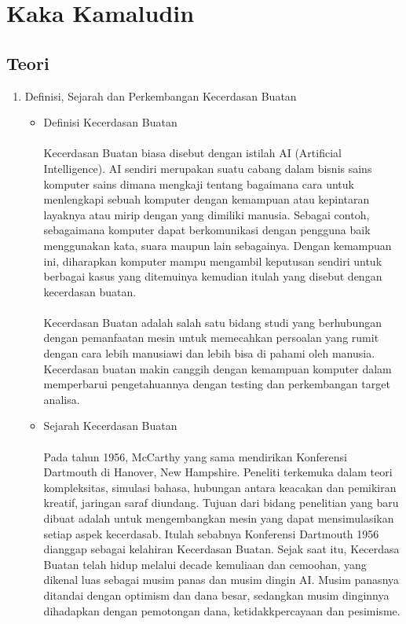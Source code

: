 \section{Kaka Kamaludin}
\subsection{Teori}

\begin{enumerate}
	\item Definisi, Sejarah dan Perkembangan Kecerdasan Buatan

		\begin{itemize}
			\item Definisi Kecerdasan Buatan
				\paragraph{}
				Kecerdasan Buatan biasa disebut dengan istilah AI (Artificial Intelligence). AI sendiri merupakan suatu cabang dalam bisnis sains komputer sains dimana mengkaji tentang bagaimana cara untuk menlengkapi sebuah komputer dengan kemampuan atau kepintaran layaknya atau mirip dengan yang dimiliki manusia. Sebagai contoh, sebagaimana komputer dapat berkomunikasi dengan pengguna baik menggunakan kata, suara maupun lain sebagainya. Dengan kemampuan ini, diharapkan komputer mampu mengambil keputusan sendiri untuk berbagai kasus yang ditemuinya kemudian itulah yang disebut dengan kecerdasan buatan. 
				\paragraph{}
				Kecerdasan Buatan adalah salah satu bidang studi yang berhubungan dengan pemanfaatan mesin untuk memecahkan persoalan yang rumit dengan cara lebih manusiawi dan lebih bisa di pahami oleh manusia. Kecerdasan buatan makin canggih dengan kemampuan komputer dalam memperbarui pengetahuannya dengan testing dan perkembangan target analisa.
			
			\item Sejarah Kecerdasan Buatan
				\paragraph{}
				Pada tahun 1956, McCarthy yang sama mendirikan Konferensi Dartmouth di Hanover, New Hampshire. Peneliti terkemuka dalam teori kompleksitas, simulasi bahasa, hubungan antara keacakan dan pemikiran kreatif, jaringan saraf diundang. Tujuan dari bidang penelitian yang baru dibuat adalah untuk mengembangkan mesin yang dapat mensimulasikan setiap aspek kecerdasab. Itulah sebabnya Konferensi Dartmouth 1956 dianggap sebagai kelahiran Kecerdasan Buatan. Sejak saat itu, Kecerdasa Buatan telah hidup melalui decade kemuliaan dan cemoohan, yang dikenal luas sebagai musim panas dan musim dingin AI. Musim panasnya ditandai dengan optimism dan dana besar, sedangkan musim dinginnya dihadapkan dengan pemotongan dana, ketidakkpercayaan dan pesimisme.
				

\end{itemize}
\end{enumerate}
